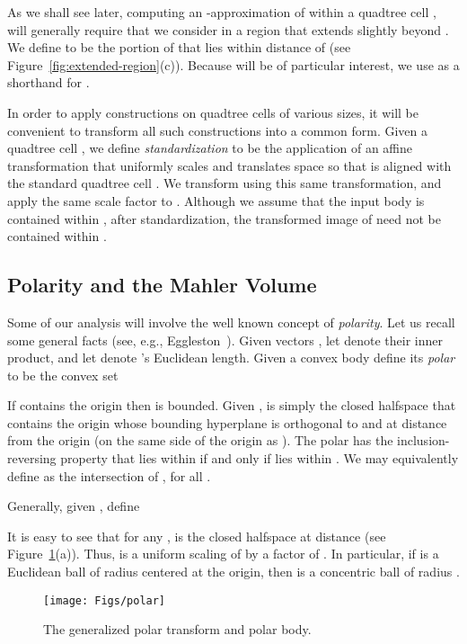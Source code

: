 \documentclass[11pt]{article}   \usepackage[letterpaper,hmargin=2.1cm,vmargin=3cm]{geometry}
\begin{document}
As we shall see later, computing an -approximation of  within a quadtree cell , will generally require that we consider  in a region that extends slightly beyond . We define  to be the portion of  that lies within distance  of  (see Figure~\ref{fig:extended-region}(c)). Because  will be of particular interest, we use  as a shorthand for .

In order to apply constructions on quadtree cells of various sizes, it will be convenient to transform all such constructions into a common form. Given a quadtree cell , we define \emph{standardization} to be the application of an affine transformation that uniformly scales and translates space so that  is aligned with the standard quadtree cell . We transform  using this same transformation, and apply the same scale factor to . Although we assume that the input body is contained within , after standardization, the transformed image of  need not be contained within .

\subsection{Polarity and the Mahler Volume} \label{sec:prelim-polar}


Some of our analysis will involve the well known concept of \emph{polarity}. Let us recall some general facts (see, e.g., Eggleston~\cite{Egg58}). Given vectors , let  denote their inner product, and let  denote 's Euclidean length. Given a convex body  define its \emph{polar} to be the convex set

If  contains the origin then  is bounded. Given ,  is simply the closed halfspace that contains the origin whose bounding hyperplane is orthogonal to  and at distance  from the origin (on the same side of the origin as ). The polar has the inclusion-reversing property that  lies within  if and only if  lies within . We may equivalently define  as the intersection of , for all . 

Generally, given , define 

It is easy to see that for any ,  is the closed halfspace at distance  (see Figure~\ref{fig:polar}(a)). Thus,  is a uniform scaling of  by a factor of . In particular, if  is a Euclidean ball of radius  centered at the origin, then  is a concentric ball of radius .

\begin{figure}[htbp]
  \centerline{\texttt{[image: Figs/polar]}}
  \caption{The generalized polar transform and polar body.}
  \label{fig:polar}
\end{figure}
\end{document}
